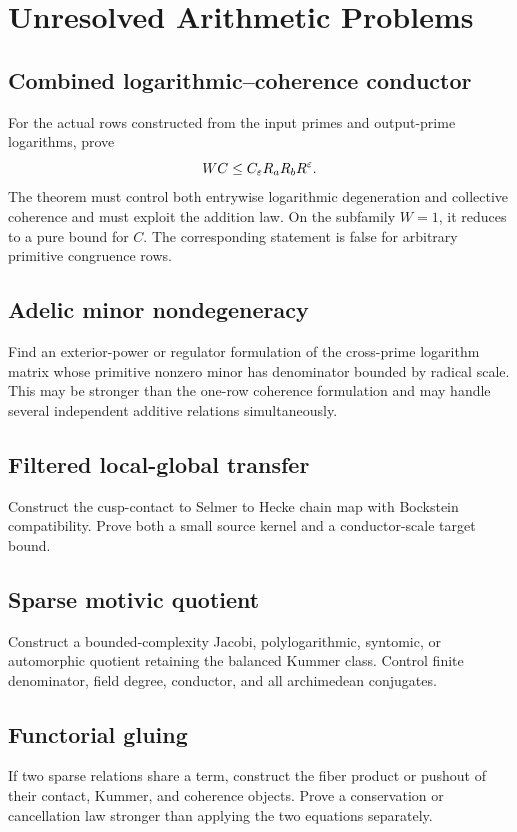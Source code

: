 \chapter{Unresolved Arithmetic Problems}

\section{Combined logarithmic--coherence conductor}
For the actual rows constructed from the input primes and output-prime logarithms, prove
\[
 WC\le C_\varepsilon R_aR_bR^\varepsilon.
\]
The theorem must control both entrywise logarithmic degeneration and collective coherence and must exploit the addition law. On the subfamily $W=1$, it reduces to a pure bound for $C$. The corresponding statement is false for arbitrary primitive congruence rows.

\section{Adelic minor nondegeneracy}
Find an exterior-power or regulator formulation of the cross-prime logarithm matrix whose primitive nonzero minor has denominator bounded by radical scale. This may be stronger than the one-row coherence formulation and may handle several independent additive relations simultaneously.

\section{Filtered local-global transfer}
Construct the cusp-contact to Selmer to Hecke chain map with Bockstein compatibility. Prove both a small source kernel and a conductor-scale target bound.

\section{Sparse motivic quotient}
Construct a bounded-complexity Jacobi, polylogarithmic, syntomic, or automorphic quotient retaining the balanced Kummer class. Control finite denominator, field degree, conductor, and all archimedean conjugates.

\section{Functorial gluing}
If two sparse relations share a term, construct the fiber product or pushout of their contact, Kummer, and coherence objects. Prove a conservation or cancellation law stronger than applying the two equations separately.

